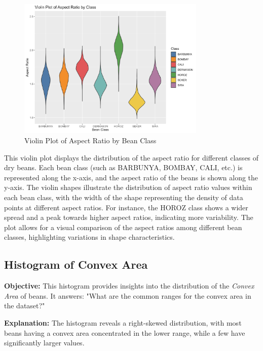 \documentclass[a4paper,12pt]{article}
\begin{document}
\begin{figure}[H]
    \centering
    \includegraphics[width=0.8\textwidth]{graphs/violinplot_aspect_ratio.png}
    \caption{Violin Plot of Aspect Ratio by Bean Class}
    \label{fig:violin_aspect_ratio}
\end{figure}
This violin plot displays the distribution of the aspect ratio for different classes of dry beans. Each bean class (such as BARBUNYA, BOMBAY, CALI, etc.) is represented along the x-axis, and the aspect ratio of the beans is shown along the y-axis. The violin shapes illustrate the distribution of aspect ratio values within each bean class, with the width of the shape representing the density of data points at different aspect ratios. For instance, the HOROZ class shows a wider spread and a peak towards higher aspect ratios, indicating more variability. The plot allows for a visual comparison of the aspect ratios among different bean classes, highlighting variations in shape characteristics.


\newpage


\subsection{Histogram of Convex Area}
\noindent\textbf{Objective:} This histogram provides insights into the distribution of the \textit{Convex Area} of beans. It answers: "What are the common ranges for the convex area in the dataset?"

\noindent\textbf{Explanation:} The histogram reveals a right-skewed distribution, with most beans having a convex area concentrated in the lower range, while a few have significantly larger values.
\end{document}
